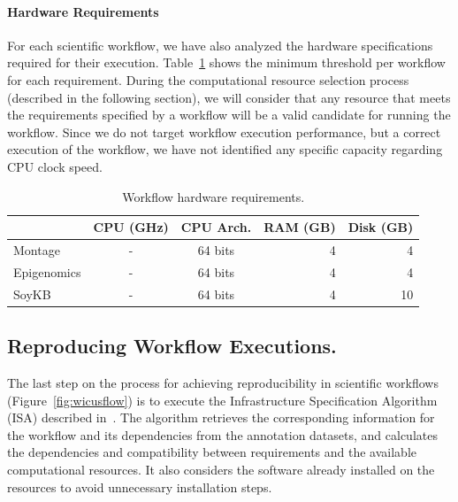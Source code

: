 \paragraph{\textbf{Hardware Requirements}}
For each scientific workflow, we have also analyzed the hardware specifications
required for their execution. Table~\ref{tab:hwreqs} shows the minimum threshold 
per workflow for each requirement. During the computational resource selection 
process (described in the following section), we will consider that any resource that
meets the requirements specified by a workflow will be a valid candidate for running 
the workflow. Since we do not target workflow execution performance, but a correct 
execution of the workflow, we have not identified any specific capacity regarding CPU
clock speed.

\begin{table}[!htb]
	\centering
	\footnotesize
	\setlength{\tabcolsep}{7pt}
	\begin{tabular}{l | c c r r}
 					& CPU (GHz) 	& CPU Arch. 	& RAM (GB)	& Disk (GB) \\ \hline
		Montage 		& -		 	& 64 bits 		& 4 			& 4 \\
		Epigenomics 	& - 			& 64 bits 		& 4 			& 4  \\
		SoyKB 		& -  			& 64 bits 		& 4 			& 10  \\
	\end{tabular}
	\caption{Workflow hardware requirements.}
	\label{tab:hwreqs}
\end{table}


\subsection{Reproducing Workflow Executions.}

The last step on the process for achieving reproducibility in scientific workflows 
(Figure~\ref{fig:wicusflow}) is to execute the Infrastructure Specification Algorithm 
(ISA) described in~\cite{wicus}. The algorithm retrieves the corresponding information for the 
workflow and its dependencies from the annotation datasets, and calculates the 
dependencies and compatibility between requirements and the available 
computational resources. It also considers the software already installed on the
resources to avoid unnecessary installation steps.

